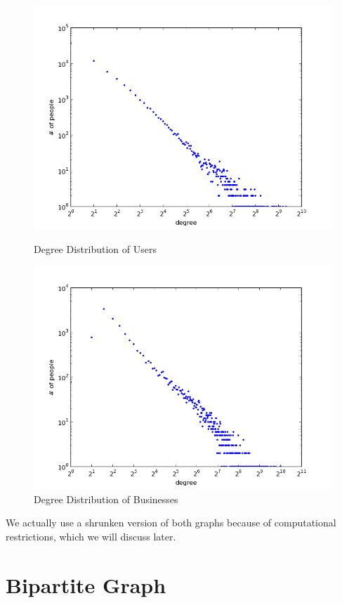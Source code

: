\documentclass[10pt]{article}
\begin{document}
\begin{figure}[ht]
\includegraphics[scale=.4]{user_degree_distribution.png} 
\caption{Degree Distribution of Users}
\label{fig:bipartite_degree_user}
\endminipage\hfill
{}
\includegraphics[scale=.4]{biz_degree_distribution.png}
\caption{Degree Distribution of Businesses}
\label{fig:bipartite_degree_biz}
\endminipage\hfill
\end{figure}

We actually use a shrunken version of both graphs because of computational restrictions, which we will discuss later.

\section{Bipartite Graph}
\label{sec:bipartite}
\end{document}
